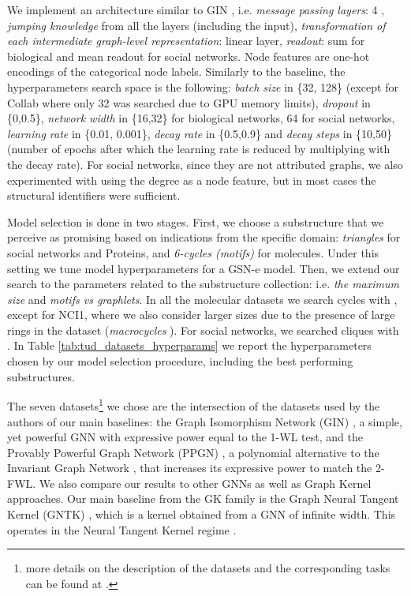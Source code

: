 \documentclass{article} \usepackage{iclr2021_conference,times}
\begin{document}
We implement an architecture similar to GIN \citep{xu2018how}, i.e. \textit{message passing layers}: 4 , \textit{jumping knowledge} from all the layers \citep{DBLP:conf/icml/XuLTSKJ18} (including the input), \textit{transformation of each intermediate graph-level representation}: linear layer, \textit{readout}: sum for biological and mean readout for social networks. Node features are one-hot encodings of the categorical node labels. Similarly to the baseline, the hyperparameters search space is the following: \textit{batch size} in \{32, 128\} (except for Collab where only 32 was searched due to GPU memory limits), \textit{dropout} in \{0,0.5\}, \textit{network width} in \{16,32\} for biological networks, 64 for social networks, \textit{learning rate} in \{0.01, 0.001\}, \textit{decay rate} in \{0.5,0.9\} and \textit{decay steps} in \{10,50\} (number of epochs after which the learning rate is reduced by multiplying with the decay rate). For social networks, since they are not attributed graphs, we also experimented with using the degree as a node feature, but in most cases the structural identifiers were sufficient. 


Model selection is done in two stages. First, we choose a substructure that we perceive as promising based on indications from the specific domain: \textit{triangles} for social networks and Proteins, and \textit{6-cycles (motifs)} for molecules. Under this setting we tune model hyperparameters for a GSN-e model. Then, we extend our search to the parameters related to the substructure collection: i.e. \textit{the maximum size } and \textit{motifs vs graphlets}. In all the molecular datasets we search cycles with , except for NCI1, where we also consider larger sizes due to the presence of large rings in the dataset (\textit{macrocycles} \citep{liu2017surveying}).  For social networks, we searched cliques with .  
In Table \ref{tab:tud_datasets_hyperparams} we report the hyperparameters chosen by our model selection procedure, including the best performing substructures.



The seven datasets\footnote{more details on the description of the datasets and the corresponding tasks can be found at \cite{xu2018how}.} we chose are the intersection of the datasets used by the authors of our main baselines: the Graph Isomorphism Network (GIN) \citep{xu2018how}, a simple, yet powerful GNN with expressive power equal to the 1-WL test, and the Provably Powerful Graph Network (PPGN) \citep{maron2019provably}, a polynomial alternative to the Invariant Graph Network \citep{DBLP:conf/iclr/MaronBSL19}, that increases its expressive power to match the 2-FWL.
We also compare our results to other GNNs as well as Graph Kernel approaches. Our main baseline from the GK family is the Graph Neural Tangent Kernel (GNTK) \citep{DBLP:conf/nips/DuHSPWX19}, which is a kernel obtained from a GNN of infinite width. This operates in the Neural Tangent Kernel regime \citep{DBLP:conf/nips/JacotHG18, DBLP:conf/icml/Allen-ZhuLS19, DBLP:conf/icml/DuLL0Z19}.
\end{document}
